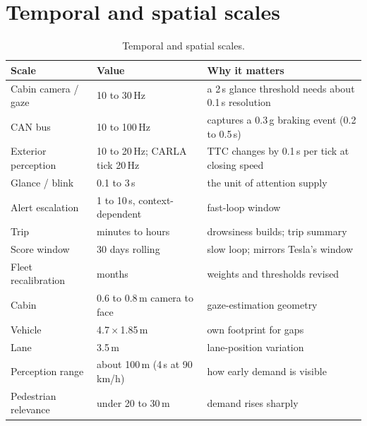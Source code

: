 \documentclass[10pt]{article}
\begin{document}
\section{Temporal and spatial scales}
\begin{table}[H]\footnotesize\centering
\begin{tabularx}{\linewidth}{@{}p{3.4cm} p{5.0cm} X@{}}\toprule
\textbf{Scale} & \textbf{Value} & \textbf{Why it matters}\\\midrule
Cabin camera / gaze & 10 to 30\,Hz & a 2\,s glance threshold needs about 0.1\,s resolution\\
CAN bus & 10 to 100\,Hz & captures a 0.3\,g braking event (0.2 to 0.5\,s)\\
Exterior perception & 10 to 20\,Hz; CARLA tick 20\,Hz & TTC changes by 0.1\,s per tick at closing speed\\
Glance / blink & 0.1 to 3\,s & the unit of attention supply\\
Alert escalation & 1 to 10\,s, context-dependent & fast-loop window\\
Trip & minutes to hours & drowsiness builds; trip summary\\
Score window & 30 days rolling & slow loop; mirrors Tesla's window\\
Fleet recalibration & months & weights and thresholds revised\\\midrule
Cabin & 0.6 to 0.8\,m camera to face & gaze-estimation geometry\\
Vehicle & 4.7\,$\times$\,1.85\,m & own footprint for gaps\\
Lane & 3.5\,m & lane-position variation\\
Perception range & about 100\,m (4\,s at 90\,km/h) & how early demand is visible\\
Pedestrian relevance & under 20 to 30\,m & demand rises sharply\\
\bottomrule\end{tabularx}
\caption{Temporal and spatial scales.}\label{tab:scales}\end{table}
\end{document}
